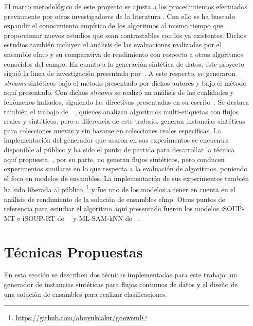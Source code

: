 El marco metodológico de este proyecto se ajusta a los procedimientos efectuados
previamente por otros investigadores de la literatura
\cite{osojnik_multi-label_2017, sousa_multi-label_2018, buyukcakir_novel_2018,
	zheng_survey_2020, read_scalable_2012}. Con ello se ha buscado expandir el
conocimiento empírico de los algoritmos al mismo tiempo que proporcionar nuevos
estudios que sean contrastables con los ya existentes. Dichos estudios también
incluyen el análisis de las evaluaciones realizadas por el ensamble
\acrshort{efmp} y su comparativa de rendimiento con respecto a otros algoritmos
conocidos del campo. En cuanto a la generación sintética de datos, este proyecto
siguió la linea de investigación presentada
por~\citeauthor{read_generating_2009}. A este respecto, se generaron
\textit{streams} sintéticos bajo el método presentado por dichos autores y bajo
el método aquí presentado. Con dichos \textit{streams} se realizó un análisis de
las cualidades y fenómenos hallados, siguiendo las directivas presentadas en su
escrito~\cite{read_generating_2009}. Se destaca también el trabajo
de~\citeauthor{read_scalable_2012}~\cite{read_scalable_2012}, quienes analizan
algoritmos multi-etiquetas con flujos reales y sintéticos, pero a diferencia de
este trabajo, generan instancias sintéticas para colecciones nuevas y sin
basarse en colecciones reales específicas. La implementación del generador que
usaron en sus experimentos se encuentra disponible al público
\cite{read_moa_2012} y ha sido el punto de partida para desarrollar la técnica
aquí propuesta.  \citeauthor{buyukcakir_novel_2018}, por su parte, no generan
flujos sintéticos, pero conducen experimentos similares en lo que respecta a la
evaluación de algoritmos, poniendo el foco en modelos de ensambles.  La
implementación de sus experimentos también ha sido liberada al
público~\footnote{\url{https://github.com/abuyukcakir/gooweml}} y fue uno de los
modelos a tener en cuenta en el análisis de rendimiento de la solución de
ensambles \acrshort{efmp}. Otros puntos de referencia para estudiar el algoritmo
aquí presentado fueron los modelos iSOUP-MT e iSOUP-RT
de~\citeauthor{osojnik_multi-label_2017}~\cite{osojnik_multi-label_2017} y
ML-SAM-kNN
de~\citeauthor{roseberry_multi-label_2018}~\cite{roseberry_multi-label_2018}.  \section{Técnicas Propuestas} En esta sección se describen dos técnicas implementadas para este trabajo: un generador de instancias sintéticas para flujos continuos de datos y el diseño de una solución de ensambles para realizar clasificaciones.

